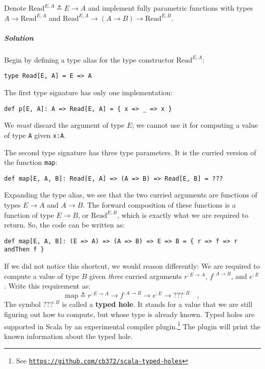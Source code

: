 Denote $\text{Read}^{E,A}\triangleq E\rightarrow A$ and implement
fully parametric functions with types $A\rightarrow\text{Read}^{E,A}$
and $\text{Read}^{E,A}\rightarrow(A\rightarrow B)\rightarrow\text{Read}^{E,B}$.

\subparagraph{Solution}

Begin by defining a type alias for the type constructor $\text{Read}^{E,A}$:
\begin{lstlisting}
type Read[E, A] = E => A
\end{lstlisting}
The first type signature has only one implementation:
\begin{lstlisting}
def p[E, A]: A => Read[E, A] = { x => _ => x }
\end{lstlisting}
We \emph{must} discard the argument of type $E$; we cannot use it
for computing a value of type \lstinline!A! given \lstinline!x:A!.

The second type signature has three type parameters. It is the curried
version of the function \lstinline!map!:
\begin{lstlisting}
def map[E, A, B]: Read[E, A] => (A => B) => Read[E, B] = ???
\end{lstlisting}
Expanding the type alias, we see that the two curried arguments are
functions of types $E\rightarrow A$ and $A\rightarrow B$. The forward
composition of these functions is a function of type $E\rightarrow B$,
or $\text{Read}^{E,B}$, which is exactly what we are required to
return. So, the code can be written as:

\begin{lstlisting}
def map[E, A, B]: (E => A) => (A => B) => E => B = { r => f => r andThen f }
\end{lstlisting}
If we did not notice this shortcut, we would reason differently: We
are required to compute a value of type $B$ given \emph{three} curried
arguments $r^{:E\rightarrow A}$, $f^{:A\rightarrow B}$, and $e^{:E}$.
Write this requirement as:
\[
\text{map}\triangleq r^{:E\rightarrow A}\rightarrow f^{:A\rightarrow B}\rightarrow e^{:E}\rightarrow???^{:B}\quad,
\]
The symbol $\text{???}^{:B}$ is called a \textbf{typed
hole}. It stands for a value that we are still figuring out how to
compute, but whose type is already known. Typed holes are supported
in Scala by an experimental compiler plugin.\footnote{See \texttt{\href{https://github.com/cb372/scala-typed-holes}{https://github.com/cb372/scala-typed-holes}}}
The plugin will print the known information about the typed hole.

